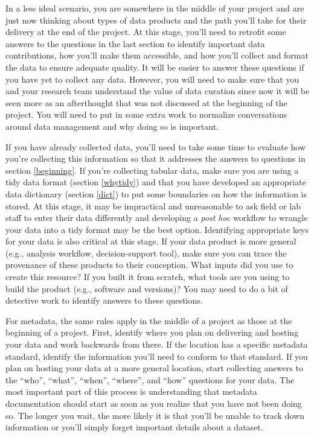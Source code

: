 \documentclass[
]{book}
\begin{document}
In a less ideal scenario, you are somewhere in the middle of your project and are just now thinking about types of data products and the path you'll take for their delivery at the end of the project. At this stage, you'll need to retrofit some answers to the questions in the last section to identify important data contributions, how you'll make them accessible, and how you'll collect and format the data to ensure adequate quality. It will be easier to answer these questions if you have yet to collect any data. However, you will need to make sure that you and your research team understand the value of data curation since now it will be seen more as an afterthought that was not discussed at the beginning of the project. You will need to put in some extra work to normalize conversations around data management and why doing so is important.

If you have already collected data, you'll need to take some time to evaluate how you're collecting this information so that it addresses the answers to questions in section \ref{beginning}. If you're collecting tabular data, make sure you are using a tidy data format (section \ref{whytidy}) and that you have developed an appropriate data dictionary (section \ref{dict}) to put some boundaries on how the information is stored. At this stage, it may be impractical and unreasonable to ask field or lab staff to enter their data differently and developing a \emph{post hoc} workflow to wrangle your data into a tidy format may be the best option. Identifying appropriate keys for your data is also critical at this stage. If your data product is more general (e.g., analysis workflow, decision-support tool), make sure you can trace the provenance of these products to their conception. What inputs did you use to create this resource? If you built it from scratch, what tools are you using to build the product (e.g., software and versions)? You may need to do a bit of detective work to identify answers to these questions.

For metadata, the same rules apply in the middle of a project as those at the beginning of a project. First, identify where you plan on delivering and hosting your data and work backwards from there. If the location has a specific metadata standard, identify the information you'll need to conform to that standard. If you plan on hosting your data at a more general location, start collecting answers to the ``who'', ``what'', ``when'', ``where'', and ``how'' questions for your data. The most important part of this process is understanding that metadata documentation should start as soon as you realize that you have not been doing so. The longer you wait, the more likely it is that you'll be unable to track down information or you'll simply forget important details about a dataset.
\end{document}
